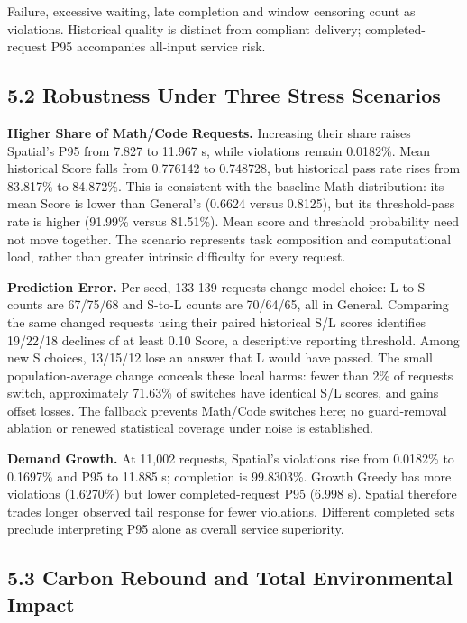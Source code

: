 Failure, excessive waiting, late completion and window censoring count
as violations. Historical quality is distinct from compliant delivery;
completed-request P95 accompanies all-input service risk.

\subsection{5.2 Robustness Under Three Stress
Scenarios}\label{sec:task4-robustness-under-three-stress-scenarios}

\textbf{Higher Share of Math/Code Requests.} Increasing their share
raises Spatial's P95 from 7.827 to 11.967 s, while violations remain
0.0182\%. Mean historical Score falls from 0.776142 to 0.748728, but
historical pass rate rises from 83.817\% to 84.872\%. This is consistent
with the baseline Math distribution: its mean Score is lower than
General's (0.6624 versus 0.8125), but its threshold-pass rate is higher
(91.99\% versus 81.51\%). Mean score and threshold probability need not
move together. The scenario represents task composition and
computational load, rather than greater intrinsic difficulty for every
request.

\textbf{Prediction Error.} Per seed, 133-139 requests change model
choice: L-to-S counts are 67/75/68 and S-to-L counts are 70/64/65, all
in General. Comparing the same changed requests using their paired
historical S/L scores identifies 19/22/18 declines of at least 0.10
Score, a descriptive reporting threshold. Among new S choices, 13/15/12
lose an answer that L would have passed. The small population-average
change conceals these local harms: fewer than 2\% of requests switch,
approximately 71.63\% of switches have identical S/L scores, and gains
offset losses. The fallback prevents Math/Code switches here; no
guard-removal ablation or renewed statistical coverage under noise is
established.

\textbf{Demand Growth.} At 11,002 requests, Spatial's violations rise
from 0.0182\% to 0.1697\% and P95 to 11.885 s; completion is 99.8303\%.
Growth Greedy has more violations (1.6270\%) but lower completed-request
P95 (6.998 s). Spatial therefore trades longer observed tail response
for fewer violations. Different completed sets preclude interpreting P95
alone as overall service superiority.



\subsection{5.3 Carbon Rebound and Total Environmental
Impact}\label{sec:task4-carbon-rebound-and-total-environmental-impact}

